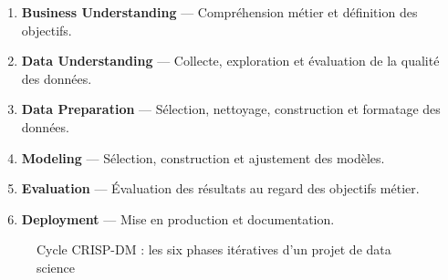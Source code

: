 \documentclass[12pt,a4paper,twoside]{report}
\begin{document}
\begin{enumerate}

  \item \textbf{Business Understanding} --- Compréhension métier et définition des objectifs.

  \item \textbf{Data Understanding} --- Collecte, exploration et évaluation de la qualité des données.

  \item \textbf{Data Preparation} --- Sélection, nettoyage, construction et formatage des données.

  \item \textbf{Modeling} --- Sélection, construction et ajustement des modèles.

  \item \textbf{Evaluation} --- Évaluation des résultats au regard des objectifs métier.

  \item \textbf{Deployment} --- Mise en production et documentation.
  \vspace{10pt}
\end{enumerate}

\begin{figure}[H]
\centering
{}
\caption{Cycle CRISP-DM : les six phases itératives d'un projet de data  science}
\label{fig:crisp_dm}
\end{figure}
\newpage
\end{document}
